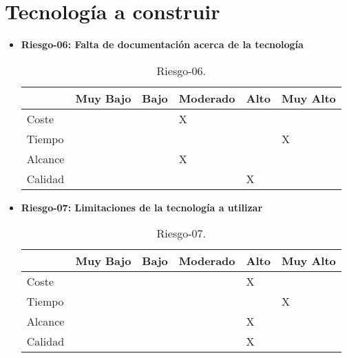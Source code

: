 \section{Tecnología a construir}
\begin{itemize}

	\item \textbf{Riesgo-06: Falta de documentación acerca de la tecnología}
	\begin{table}[H]
	\begin{center}
	\begin{tabular}{ l l l l l l }
	\hline
	& Muy Bajo & Bajo & Moderado & Alto & Muy Alto \\ \hline \hline
	Coste &  &  & X & &  \\ \hline
	Tiempo &  &  &  &  & X \\ \hline
	Alcance &  &  & X & &  \\ \hline
	Calidad &  &  &  & X &  \\ \hline
	\end{tabular}
	\caption{Riesgo-06.}
	\label{Riesgo-06}
	\end{center}
	\end{table}
	\item \textbf{Riesgo-07: Limitaciones de la tecnología a utilizar}
	\begin{table}[H]
	\begin{center}
	\begin{tabular}{ l l l l l l }
	\hline
	& Muy Bajo & Bajo & Moderado & Alto & Muy Alto \\ \hline \hline
	Coste &  &  &  & X &  \\ \hline
	Tiempo &  &  &  &  & X \\ \hline
	Alcance &  &  &  & X &  \\ \hline
	Calidad &  &  &  & X &  \\ \hline
	\end{tabular}
	\caption{Riesgo-07.}
	\label{Riesgo-07}
	\end{center}
	\end{table}
\end{itemize}

